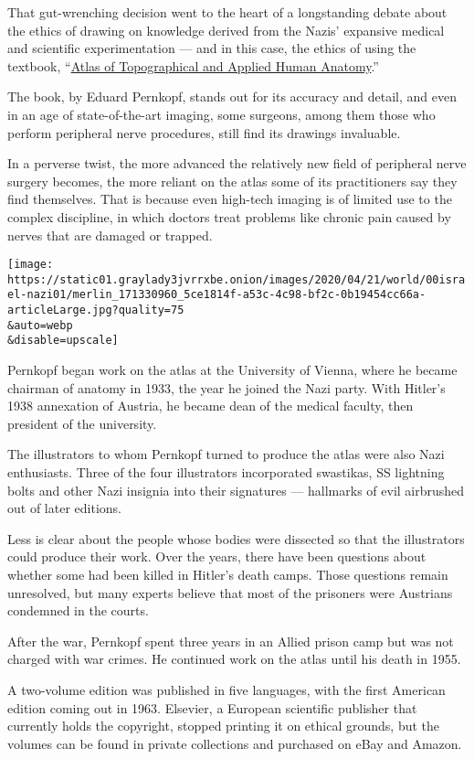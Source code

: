 That gut-wrenching decision went to the heart of a longstanding debate
about the ethics of drawing on knowledge derived from the Nazis'
expansive medical and scientific experimentation --- and in this case,
the ethics of using the textbook,
``\href{https://www.nytimes3xbfgragh.onion/1996/11/26/science/doctors-question-use-of-nazi-s-medical-atlas.html}{Atlas
of Topographical and Applied Human Anatomy}.''

The book, by Eduard Pernkopf, stands out for its accuracy and detail,
and even in an age of state-of-the-art imaging, some surgeons, among
them those who perform peripheral nerve procedures, still find its
drawings invaluable.

In a perverse twist, the more advanced the relatively new field of
peripheral nerve surgery becomes, the more reliant on the atlas some of
its practitioners say they find themselves. That is because even
high-tech imaging is of limited use to the complex discipline, in which
doctors treat problems like chronic pain caused by nerves that are
damaged or trapped.

\texttt{[image: https://static01.graylady3jvrrxbe.onion/images/2020/04/21/world/00israel-nazi01/merlin\_171330960\_5ce1814f-a53c-4c98-bf2c-0b19454cc66a-articleLarge.jpg?quality=75\\\&auto=webp\\\&disable=upscale]}

Pernkopf began work on the atlas at the University of Vienna, where he
became chairman of anatomy in 1933, the year he joined the Nazi party.
With Hitler's 1938 annexation of Austria, he became dean of the medical
faculty, then president of the university.

The illustrators to whom Pernkopf turned to produce the atlas were also
Nazi enthusiasts. Three of the four illustrators incorporated swastikas,
SS lightning bolts and other Nazi insignia into their signatures ---
hallmarks of evil airbrushed out of later editions.

Less is clear about the people whose bodies were dissected so that the
illustrators could produce their work. Over the years, there have been
questions about whether some had been killed in Hitler's death camps.
Those questions remain unresolved, but many experts believe that most of
the prisoners were Austrians condemned in the courts.

After the war, Pernkopf spent three years in an Allied prison camp but
was not charged with war crimes. He continued work on the atlas until
his death in 1955.

A two-volume edition was published in five languages, with the first
American edition coming out in 1963. Elsevier, a European scientific
publisher that currently holds the copyright, stopped printing it on
ethical grounds, but the volumes can be found in private collections and
purchased on eBay and Amazon.

